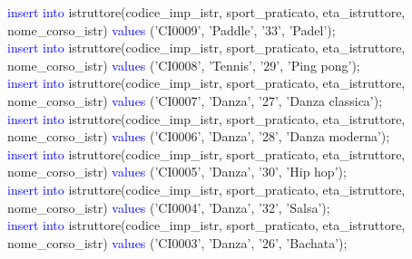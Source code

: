 \documentclass{article}
\begin{document}
\begin{flushleft}
{        \newpage
        \hspace*{0.5em}\textcolor{blue}{insert into} istruttore(codice\_imp\_istr, sport\_praticato, eta\_istruttore, \hspace*{0.5em}nome\_corso\_istr) \textcolor{blue}{values} ('CI0009', 'Paddle', '33', 'Padel'); \\
        \vspace{2mm}
        \hspace*{0.5em}\textcolor{blue}{insert into} istruttore(codice\_imp\_istr, sport\_praticato, eta\_istruttore, \hspace*{0.5em}nome\_corso\_istr) \textcolor{blue}{values} ('CI0008', 'Tennis', '29', 'Ping pong'); \\
        \vspace{2mm}
        \hspace*{0.5em}\textcolor{blue}{insert into} istruttore(codice\_imp\_istr, sport\_praticato, eta\_istruttore, \hspace*{0.5em}nome\_corso\_istr) \textcolor{blue}{values} ('CI0007', 'Danza', '27', 'Danza classica'); \\
        \vspace{2mm}
        \hspace*{0.5em}\textcolor{blue}{insert into} istruttore(codice\_imp\_istr, sport\_praticato, eta\_istruttore, \hspace*{0.5em}nome\_corso\_istr) \textcolor{blue}{values} ('CI0006', 'Danza', '28', 'Danza moderna'); \\
        \vspace{2mm}
        \hspace*{0.5em}\textcolor{blue}{insert into} istruttore(codice\_imp\_istr, sport\_praticato, eta\_istruttore, \hspace*{0.5em}nome\_corso\_istr) \textcolor{blue}{values} ('CI0005', 'Danza', '30', 'Hip hop'); \\
        \hspace*{0.5em}\textcolor{blue}{insert into} istruttore(codice\_imp\_istr, sport\_praticato, eta\_istruttore, \hspace*{0.5em}nome\_corso\_istr) \textcolor{blue}{values} ('CI0004', 'Danza', '32', 'Salsa'); \\
        \vspace{2mm}
        \hspace*{0.5em}\textcolor{blue}{insert into} istruttore(codice\_imp\_istr, sport\_praticato, eta\_istruttore, \hspace*{0.5em}nome\_corso\_istr) \textcolor{blue}{values} ('CI0003', 'Danza', '26', 'Bachata'); \\
}
\end{flushleft}
\end{document}
